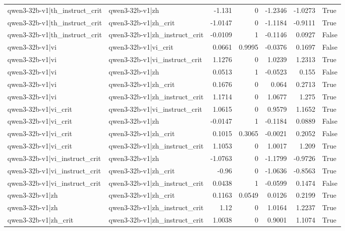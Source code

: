 \begin{table}
\begin{tabular}{l l r r r r l}
qwen3-32b-v1|th_instruct_crit & qwen3-32b-v1|zh & -1.131 & 0 & -1.2346 & -1.0273 & True \\
qwen3-32b-v1|th_instruct_crit & qwen3-32b-v1|zh_crit & -1.0147 & 0 & -1.1184 & -0.9111 & True \\
qwen3-32b-v1|th_instruct_crit & qwen3-32b-v1|zh_instruct_crit & -0.0109 & 1 & -0.1146 & 0.0927 & False \\
qwen3-32b-v1|vi & qwen3-32b-v1|vi_crit & 0.0661 & 0.9995 & -0.0376 & 0.1697 & False \\
qwen3-32b-v1|vi & qwen3-32b-v1|vi_instruct_crit & 1.1276 & 0 & 1.0239 & 1.2313 & True \\
qwen3-32b-v1|vi & qwen3-32b-v1|zh & 0.0513 & 1 & -0.0523 & 0.155 & False \\
qwen3-32b-v1|vi & qwen3-32b-v1|zh_crit & 0.1676 & 0 & 0.064 & 0.2713 & True \\
qwen3-32b-v1|vi & qwen3-32b-v1|zh_instruct_crit & 1.1714 & 0 & 1.0677 & 1.275 & True \\
qwen3-32b-v1|vi_crit & qwen3-32b-v1|vi_instruct_crit & 1.0615 & 0 & 0.9579 & 1.1652 & True \\
qwen3-32b-v1|vi_crit & qwen3-32b-v1|zh & -0.0147 & 1 & -0.1184 & 0.0889 & False \\
qwen3-32b-v1|vi_crit & qwen3-32b-v1|zh_crit & 0.1015 & 0.3065 & -0.0021 & 0.2052 & False \\
qwen3-32b-v1|vi_crit & qwen3-32b-v1|zh_instruct_crit & 1.1053 & 0 & 1.0017 & 1.209 & True \\
qwen3-32b-v1|vi_instruct_crit & qwen3-32b-v1|zh & -1.0763 & 0 & -1.1799 & -0.9726 & True \\
qwen3-32b-v1|vi_instruct_crit & qwen3-32b-v1|zh_crit & -0.96 & 0 & -1.0636 & -0.8563 & True \\
qwen3-32b-v1|vi_instruct_crit & qwen3-32b-v1|zh_instruct_crit & 0.0438 & 1 & -0.0599 & 0.1474 & False \\
qwen3-32b-v1|zh & qwen3-32b-v1|zh_crit & 0.1163 & 0.0549 & 0.0126 & 0.2199 & True \\
qwen3-32b-v1|zh & qwen3-32b-v1|zh_instruct_crit & 1.12 & 0 & 1.0164 & 1.2237 & True \\
qwen3-32b-v1|zh_crit & qwen3-32b-v1|zh_instruct_crit & 1.0038 & 0 & 0.9001 & 1.1074 & True \\
\bottomrule
\end{tabular}
\end{table}
